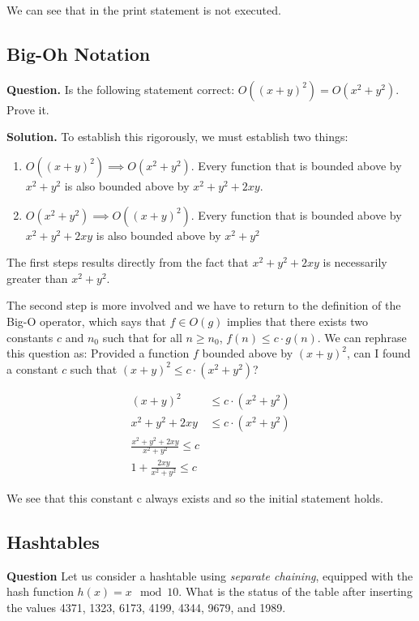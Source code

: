 \documentclass[11pt]{article}
\begin{document}
We can see that in the print statement is not executed.

\subsection{Big-Oh Notation}
\label{sec:org55ee8ee}
\textbf{\textbf{Question.}} Is the following statement correct: \(O((x+y)^2) =
    O(x^2+y^2)\). Prove it.

\textbf{Solution.} To establish this rigorously, we must establish two things:
\begin{enumerate}
\item \(O((x+y)^2) \implies O(x^2+ y^2)\). Every function that is
bounded above by \(x^2+y^2\) is also bounded above by \(x^2 + y^2 +
      2xy\).
\item \(O(x^2+y^2) \implies O((x+y)^2)\). Every function that is bounded above by \(x^2 + y^2 + 2xy\) is also
bounded above by \(x^2 + y^2\)
\end{enumerate}

The first steps results directly from the fact that \(x^2 + y^2 +
   2xy\) is necessarily greater than \(x^2 + y^2\).

The second step is more involved and we have to return to the
definition of the Big-O operator, which says that \(f \in O(g)\)
implies that there exists two constants \(c\) and \(n_0\) such that for
all \(n \geq n_0\), \(f(n) \leq c \cdot g(n)\). We can rephrase this
question as: Provided a function \(f\) bounded above by \((x+y)^2\),
can I found a constant \(c\) such that \((x+y)^2 \leq c \cdot (x^2 +
   y^2)\)?

\begin{align*}
   (x+y)^2 &\leq c \cdot (x^2 + y^2) \\
    x^2 + y^2 + 2xy & \leq c \cdot (x^2 + y^2) \\
    \frac{x^2 + y^2 + 2xy}{x^2 + y^2} \leq c \\
    1 +  \frac{2xy}{x^2 + y^2} \leq c
\end{align*}

We see that this constant c always exists and so the initial
statement holds.


\subsection{Hashtables}
\label{sec:org2fbf528}
\textbf{Question} Let us consider a hashtable using \emph{separate chaining},
    equipped with the hash function \(h(x) = x \mod 10\). What is the
    status of the table after inserting the values 4371, 1323, 6173,
    4199, 4344, 9679, and 1989.
\end{document}
